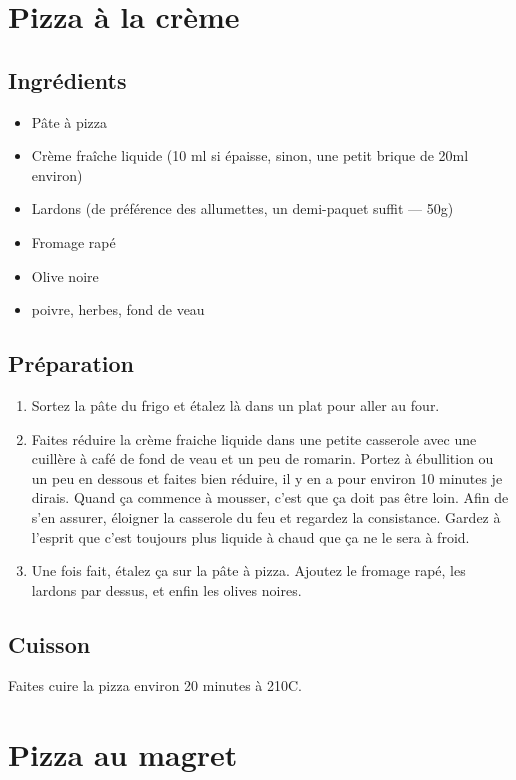 \newpage
\section{Pizza à la crème}
\subsection*{Ingrédients}
\begin{itemize}
\item Pâte à pizza
\item Crème fraîche liquide (10 ml si épaisse, sinon, une petit brique de 20ml environ)
\item Lardons (de préférence des allumettes, un demi-paquet suffit --- 50g)
\item Fromage rapé
\item Olive noire
\item poivre, herbes, fond de veau
\end{itemize}

\subsection*{Préparation}
\begin{enumerate}
\item Sortez la pâte du frigo et étalez là dans un plat pour aller au four.
\item Faites réduire la crème fraiche liquide dans une petite casserole avec une cuillère à café de fond de veau et un peu de romarin. Portez à ébullition ou un peu en dessous et faites bien réduire, il y en a pour environ 10 minutes je dirais. Quand ça commence à mousser, c'est que ça doit pas être loin. Afin de s'en assurer, éloigner la casserole du feu et regardez la consistance. Gardez à l'esprit que c'est toujours plus liquide à chaud que ça ne le sera à froid.
\item Une fois fait, étalez ça sur la pâte à pizza. Ajoutez le fromage rapé, les lardons par dessus, et enfin les olives noires.
\end{enumerate}

\subsection*{Cuisson}
Faites cuire la pizza environ 20 minutes à 210\degres C.

\newpage
\section{Pizza au magret}
